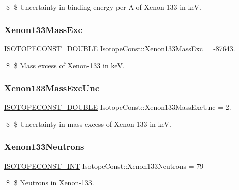\$ \$ Uncertainty in binding energy per A of Xenon-\/133 in keV. \mbox{\label{group___isotope_const-_xenon-_xe133_ga1f2e5ea55d2f6835b3f0648e885f8976}} 
\subsubsection{\texorpdfstring{Xenon133\+Mass\+Exc}{Xenon133MassExc}}
{\footnotesize\ttfamily \mbox{\hyperlink{group___isotope_const-_macros_ga8f45a7272ce02c0b4c65c44636ed719a}{I\+S\+O\+T\+O\+P\+E\+C\+O\+N\+S\+T\+\_\+\+D\+O\+U\+B\+LE}} Isotope\+Const\+::\+Xenon133\+Mass\+Exc = -\/87643.}

\$ \$ Mass excess of Xenon-\/133 in keV. \mbox{\label{group___isotope_const-_xenon-_xe133_ga17116b0e9744697fe2f1b967614d9ff2}} 
\subsubsection{\texorpdfstring{Xenon133\+Mass\+Exc\+Unc}{Xenon133MassExcUnc}}
{\footnotesize\ttfamily \mbox{\hyperlink{group___isotope_const-_macros_ga8f45a7272ce02c0b4c65c44636ed719a}{I\+S\+O\+T\+O\+P\+E\+C\+O\+N\+S\+T\+\_\+\+D\+O\+U\+B\+LE}} Isotope\+Const\+::\+Xenon133\+Mass\+Exc\+Unc = 2.}

\$ \$ Uncertainty in mass excess of Xenon-\/133 in keV. \mbox{\label{group___isotope_const-_xenon-_xe133_ga8e076c5656e96c699cc27b88fc38d193}} 
\subsubsection{\texorpdfstring{Xenon133\+Neutrons}{Xenon133Neutrons}}
{\footnotesize\ttfamily \mbox{\hyperlink{group___isotope_const-_macros_ga5f18360b3e99483a35c32d789e62621c}{I\+S\+O\+T\+O\+P\+E\+C\+O\+N\+S\+T\+\_\+\+I\+NT}} Isotope\+Const\+::\+Xenon133\+Neutrons = 79}

\$ \$ Neutrons in Xenon-\/133. \mbox{\label{group___isotope_const-_xenon-_xe133_ga6c74f6fad2b8b1072f1334ca5ab414ff}} 
